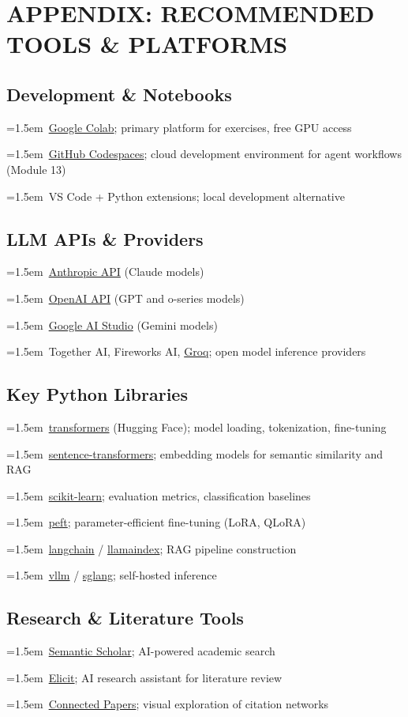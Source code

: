\documentclass[11pt, a4paper]{article}
\newcommand{\resource}[1]{%
  \par\hangindent=1.5em\hangafter=1\noindent\hspace{0.5em}{\small\textcolor{accent}{\guilsinglright}}~{\small #1}\par
}
\begin{document}
\newpage
\section{APPENDIX: RECOMMENDED TOOLS \& PLATFORMS}

\subsection{Development \& Notebooks}

\resource{\href{https://colab.research.google.com}{Google Colab}; primary platform for exercises, free GPU access}
\resource{\href{https://github.com/features/codespaces}{GitHub Codespaces}; cloud development environment for agent workflows (Module 13)}
\resource{VS Code + Python extensions; local development alternative}

\subsection{LLM APIs \& Providers}

\resource{\href{https://docs.anthropic.com}{Anthropic API} (Claude models)}
\resource{\href{https://platform.openai.com}{OpenAI API} (GPT and o-series models)}
\resource{\href{https://aistudio.google.com}{Google AI Studio} (Gemini models)}
\resource{Together AI, Fireworks AI, \href{https://groq.com}{Groq}; open model inference providers}

\subsection{Key Python Libraries}

\resource{\href{https://huggingface.co/docs/transformers}{transformers} (Hugging Face); model loading, tokenization, fine-tuning}
\resource{\href{https://www.sbert.net}{sentence-transformers}; embedding models for semantic similarity and RAG}
\resource{\href{https://scikit-learn.org}{scikit-learn}; evaluation metrics, classification baselines}
\resource{\href{https://github.com/huggingface/peft}{peft}; parameter-efficient fine-tuning (LoRA, QLoRA)}
\resource{\href{https://python.langchain.com}{langchain} / \href{https://www.llamaindex.ai}{llamaindex}; RAG pipeline construction}
\resource{\href{https://github.com/vllm-project/vllm}{vllm} / \href{https://github.com/sgl-project/sglang}{sglang}; self-hosted inference}

\subsection{Research \& Literature Tools}

\resource{\href{https://www.semanticscholar.org}{Semantic Scholar}; AI-powered academic search}
\resource{\href{https://elicit.com}{Elicit}; AI research assistant for literature review}
\resource{\href{https://www.connectedpapers.com}{Connected Papers}; visual exploration of citation networks}
\end{document}
